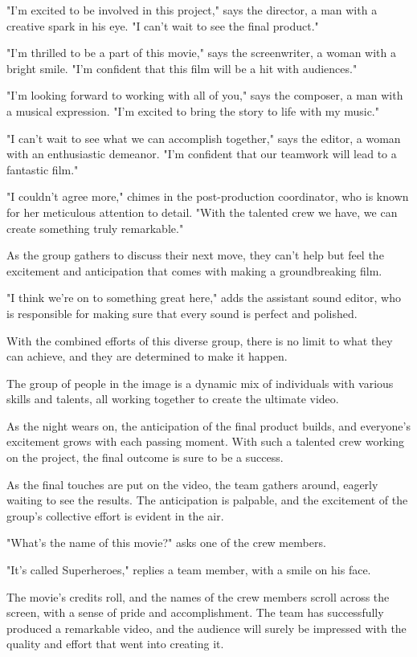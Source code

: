 \documentclass[smalldemyvopaper,11pt,twoside,onecolumn,openright,extrafontsizes]{memoir}
\begin{document}
"I'm excited to be involved in this project," says the director, a man with a creative spark in his eye. "I can't wait to see the final product."\par
"I'm thrilled to be a part of this movie," says the screenwriter, a woman with a bright smile. "I'm confident that this film will be a hit with audiences."\par
"I'm looking forward to working with all of you," says the composer, a man with a musical expression. "I'm excited to bring the story to life with my music."\par
"I can't wait to see what we can accomplish together," says the editor, a woman with an enthusiastic demeanor. "I'm confident that our teamwork will lead to a fantastic film."\par
"I couldn't agree more," chimes in the post-production coordinator, who is known for her meticulous attention to detail. "With the talented crew we have, we can create something truly remarkable."\par
As the group gathers to discuss their next move, they can't help but feel the excitement and anticipation that comes with making a groundbreaking film.\par
"I think we're on to something great here," adds the assistant sound editor, who is responsible for making sure that every sound is perfect and polished.\par
With the combined efforts of this diverse group, there is no limit to what they can achieve, and they are determined to make it happen.\par
The group of people in the image is a dynamic mix of individuals with various skills and talents, all working together to create the ultimate video.\par
As the night wears on, the anticipation of the final product builds, and everyone's excitement grows with each passing moment. With such a talented crew working on the project, the final outcome is sure to be a success.\par
As the final touches are put on the video, the team gathers around, eagerly waiting to see the results. The anticipation is palpable, and the excitement of the group's collective effort is evident in the air.\par
"What's the name of this movie?" asks one of the crew members.\par
"It's called Superheroes," replies a team member, with a smile on his face.\par
The movie's credits roll, and the names of the crew members scroll across the screen, with a sense of pride and accomplishment. The team has successfully produced a remarkable video, and the audience will surely be impressed with the quality and effort that went into creating it.\par
\end{document}
